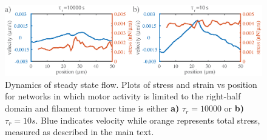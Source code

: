 \documentclass[10pt,letterpaper]{article}
\begin{document}
\begin{figure}[h!]
\centering
\includegraphics[width=\hsize]{figures/figureS7}
\caption{\label{fig:combo_prof}  Dynamics of steady state flow. Plots of stress and strain vs position for networks in which motor activity is limited to the right-half domain and filament turnover time is either  \textbf{a)} $\tau_r = 10000$ or  \textbf{b)} $\tau_r = 10 s$.  Blue indicates velocity while orange represents total stress, measured as described in the main text. }
\end{figure}
\end{document}
